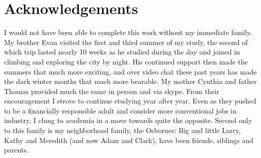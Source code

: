 

\chapter{Acknowledgements}

I would not have been able to complete this work without my immediate family. My brother Evan visited the first and third summer of my study, the second of which trip lasted nearly 10 weeks as he studied during the day and joined in climbing and exploring the city by night. His continued support then made the summers that much more exciting, and over video chat these past years has made the dark winter months that much more bearable. My mother Cynthia and father Thomas provided much the same in person and via skype. From their encouragement I strove to continue studying year after year. Even as they pushed to be a financially responsible adult and consider more conventional jobs in industry, I clung to academia in a move towards quite the opposite. Second only to this family is my neighborhood family, the Osbornes: Big and little Larry, Kathy and Meredith (and now Adam and Clark), have been friends, siblings and parents.

